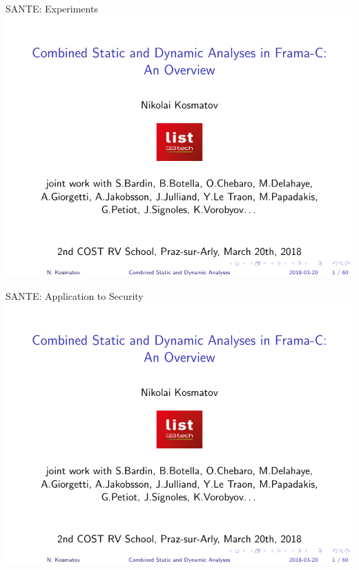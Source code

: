 \begin{frame}{SANTE: Experiments}
  \includegraphics[page=52,width=\textwidth,trim={0cm 0.75cm 0 1.25cm},clip]{tutorial_2018_03_20_costrv2018.pdf}
\end{frame}



\begin{frame}{SANTE: Application to Security}
  \includegraphics[page=53,width=\textwidth,trim={0cm 1cm 0 1.25cm},clip]{tutorial_2018_03_20_costrv2018.pdf}
\end{frame}





